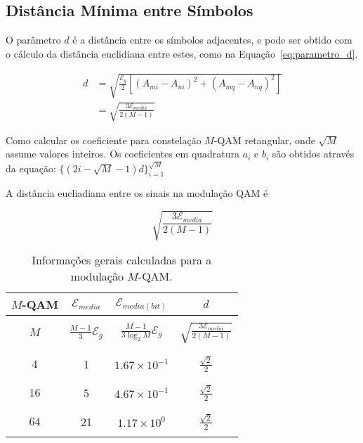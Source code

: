 \subsection{Distância Mínima entre Símbolos}

O parâmetro $d$ é a distância entre os símbolos adjacentes, e pode ser obtido com o cálculo da distância euclidiana entre estes, como na Equação~\ref{eq:parametro_d}.

\begin{equation}
    \begin{split}
        d & = \sqrt{\frac{\mathcal{E}_g}{2}[(A_{mi} - A_{ni})^2 + (A_{mq} - A_{nq})^2]}\\
        & = \sqrt{\frac{3 \mathcal{E}_{media}}{2(M-1)}}
    \end{split}
    \label{eq:parametro_d}
\end{equation}

Como calcular os coeficiente para constelação $M$-QAM retangular, onde $\sqrt{M}$ assume valores inteiros. Os coeficientes em quadratura $a_i$ e $b_i$ são obtidos através da equação: $\{ (2i -\sqrt{M} - 1)d \}_{i=1}^{\sqrt{M}} $ 

A distância eucliadiana entre os sinais na modulação QAM é

$$\sqrt{\frac{3 \mathcal{E}_{media}}{2(M-1)}} $$

\begin{table}[!ht]
    \centering
    \begin{tabular}{|c|c|c|c|}
        \hline
        $M$-QAM & $\mathcal{E}_{media}$ & $\mathcal{E}_{media(bit)}$ & $d$ \\ \hline
        & &  &  \\ 
        $M$ & $\frac{M-1}{3} \mathcal{E}_g$ & $ \frac{M-1}{3\log_2 M} \mathcal{E}_g$ & $\sqrt{\frac{3 \mathcal{E}_{media}}{2(M-1)}} $ \\ 
        & &  &  \\ \hline
        & &  &  \\ 
        $4$     & 1 & $1.67\times 10^{-1}$ & $\frac{\sqrt{2}}{2}$ \\ 
        & &  &  \\ \hline
        & &  &  \\ 
        $16$    & 5 & $4.67\times 10^{-1}$ & $\frac{\sqrt{2}}{2}$ \\ 
        & &  &  \\ \hline
        & &  &  \\ 
        $64$    & 21 & $1.17\times 10^{0}$ & $\frac{\sqrt{2}}{2}$ \\
        & &  &  \\ \hline
    \end{tabular}
    \caption{Informações gerais calculadas para a modulação $M$-QAM.}
    \label{tab:Resume_QAM}
\end{table}

